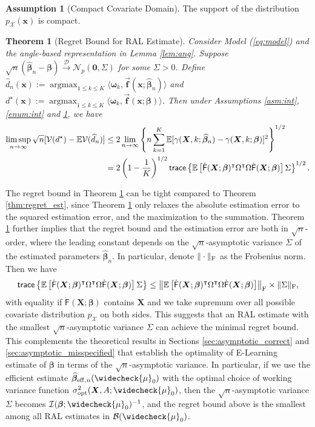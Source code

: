 \documentclass[11pt]{article}
\newtheorem{thm}{Theorem}
\theoremstyle{definition}
\newtheorem{asm}{Assumption}
\theoremstyle{remark}
\newcommand{\bbf}{\bm{f}}
\newcommand{\bx}{\bm{x}}
\newcommand{\bX}{\bm{X}}
\newcommand{\bbeta}{\bm{\beta}}
\newcommand{\bomega}{\bm{\omega}}
\newcommand{\bbE}{\mathbb{E}}
\newcommand{\cB}{\mathcal{B}}
\newcommand{\cD}{\mathcal{D}}
\newcommand{\cI}{\mathcal{I}}
\newcommand{\cN}{\mathcal{N}}
\newcommand{\cV}{\mathcal{V}}
\newcommand{\sX}{\mathscr{X}}
\newcommand{\sfF}{\mathsf{F}}
\newcommand{\argmax}{\mathop{\mathrm{argmax}}}
\newcommand{\tr}{\mathsf{trace}}	    %
\newcommand{\bzero}{\mathbf{0}}	%
\newcommand{\eff}{\mathrm{eff}}
\newcommand{\opt}{\mathrm{opt}}
\begin{document}
\begin{asm}[Compact Covariate Domain]\label{asm:cmpt}
	The support of the distribution $ p_{\sX}(\bx) $ is compact.
\end{asm}

\begin{thm}[Regret Bound for RAL Estimate]\label{thm:regret_par}
	Consider Model (\ref{eq:model}) and the angle-based representation in Lemma \ref{lem:ang}. Suppose $ \sqrt{n}(\widehat{\bbeta}_{n} - \bbeta) \stackrel{\cD}{\to} \cN_{p}(\bzero,\Sigma) $ for some $ \Sigma > 0 $. Define $ \widehat{d}_{n}(\bx) := \argmax_{1 \le k \le K}\langle \bomega_{k},\vec{\bbf}(\bx;\widehat{\bbeta}_{n}) \rangle $ and $ d^{\star}(\bx) := \argmax_{1 \le k \le K}\langle \bomega_{k},\vec{\bbf}(\bx;\bbeta) \rangle $. Then under Assumptions \ref{asm:int}, \ref{enum:int} and \ref{asm:cmpt}, we have
	\begin{align*}
		\limsup_{n\to\infty}\sqrt{n}[\cV(d^{\star}) - \bbE\cV(\widehat{d}_{n})] &\le 2\lim_{n\to\infty}\left\{ n\sum_{k=1}^{K} \bbE[\gamma(\bX,k;\widehat{\bbeta}_{n}) - \gamma(\bX,k;\bbeta)]^{2} \right\}^{1/2}\\
		&= 2\left( 1 - {1 \over K} \right)^{1/2}\tr\left\{ \bbE\left[ \dot{\sfF}(\bX;\bbeta)^{\intercal}\Omega^{\intercal}\Omega\dot{\sfF}(\bX;\bbeta) \right]\Sigma \right\}^{1/2}.
	\end{align*}
\end{thm}

The regret bound in Theorem \ref{thm:regret_par} can be tight compared to Theorem \ref{thm:regret_est}, since Theorem \ref{thm:regret_par} only relaxes the absolute estimation error to the squared estimation error, and the maximization to the summation. Theorem \ref{thm:regret_par} further implies that the regret bound and the estimation error are both in $ \sqrt{n} $-order, where the leading constant depends on the $ \sqrt{n} $-asymptotic variance $ \Sigma $ of the estimated parameters $ \widehat{\bbeta}_{n} $. In particular, denote $ \| \cdot \|_{\rm F} $ as the Frobenius norm. Then we have
\[ \tr\left\{ \bbE\left[ \dot{\sfF}(\bX;\bbeta)^{\intercal}\Omega^{\intercal}\Omega\dot{\sfF}(\bX;\bbeta) \right]\Sigma \right\} \le \left \| \bbE\left[ \dot{\sfF}(\bX;\bbeta)^{\intercal}\Omega^{\intercal}\Omega\dot{\sfF}(\bX;\bbeta) \right] \right \|_{\rm F} \times \| \Sigma \|_{\rm F}, \]
with equality if $ \dot{\sfF}(\bX;\bbeta) $ contains $ \bX $ and we take supremum over all possible covariate distribution $ p_{\sX} $ on both sides. This  suggests that an RAL estimate with the smallest $ \sqrt{n} $-asymptotic variance $ \Sigma $ can achieve the minimal regret bound. This complements the theoretical results in Sections \ref{sec:asymptotic_correct} and \ref{sec:asymptotic_misspecified} that establish the optimality of E-Learning estimate of $ \bbeta $ in terms of the $ \sqrt{n} $-asymptotic variance. In particular, if we use the efficient estimate $ \widehat{\bbeta}_{\eff,n}(\widecheck{\mu}_{0}) $ with the optimal choice of working variance function $ \sigma_{\opt}^{2}(\bX,A;\widecheck{\mu}_{0}) $, then the $ \sqrt{n} $-asymptotic variance $ \Sigma $ becomes $ \cI(\bbeta;\widecheck{\mu}_{0})^{-1} $, and the regret bound above is the smallest among all RAL estimates in $ \cB(\widecheck{\mu}_{0}) $.
\end{document}

